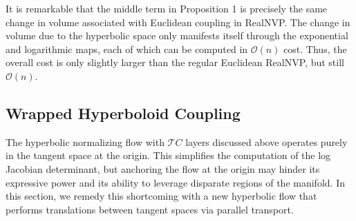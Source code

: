 It is remarkable that the middle term in Proposition 1 is precisely the same change in volume associated with Euclidean coupling in RealNVP.
The change in volume due to the hyperbolic space only manifests itself through the exponential and logarithmic maps, each of which can be computed in $\mathcal{O}(n)$ cost. Thus, the overall cost is only slightly larger than the regular Euclidean RealNVP, but still $\mathcal{O}(n)$.

\subsection{Wrapped Hyperboloid Coupling}
\label{wrapped_hyerboloid_coupling_section}
The hyperbolic normalizing flow with $\mathcal{T}C$ layers discussed above operates purely in the tangent space at the origin.
This simplifies the computation of the log Jacobian determinant, but anchoring the flow at the origin may hinder its expressive power and its ability to leverage disparate regions of the manifold. 
In this section, we remedy this shortcoming with a new hyperbolic flow that performs translations between tangent spaces via parallel transport. 

